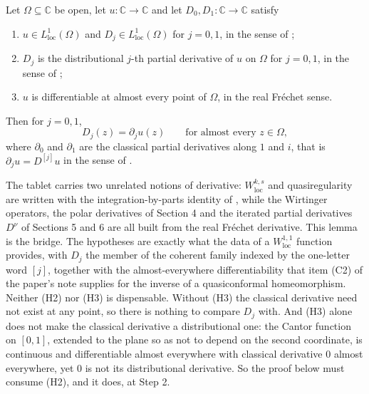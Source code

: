 \begin{lemma}
Let $\Omega\subseteq\mathbb{C}$ be open, let $u\colon\mathbb{C}\to\mathbb{C}$
and let $D_0,D_1\colon\mathbb{C}\to\mathbb{C}$ satisfy
\begin{enumerate}
\item[(H1)] $u\in L^{1}_{\mathrm{loc}}(\Omega)$ and
  $D_j\in L^{1}_{\mathrm{loc}}(\Omega)$ for $j=0,1$, in the sense of
  ;
\item[(H2)] $D_j$ is the distributional $j$-th partial derivative of $u$ on
  $\Omega$ for $j=0,1$, in the sense of ;
\item[(H3)] $u$ is differentiable at almost every point of $\Omega$, in the
  real Fr\'echet sense.
\end{enumerate}
Then for $j=0,1$,
\[
  D_j(z)=\partial_j u(z)\qquad\text{for almost every }z\in\Omega,
\]
where $\partial_0$ and $\partial_1$ are the classical partial derivatives
along $1$ and $i$, that is $\partial_ju=D^{[j]}u$ in the sense of
.

The tablet carries two unrelated notions of derivative: $W^{k,s}_{\mathrm{loc}}$
and quasiregularity are written with the integration-by-parts identity of
, while the Wirtinger operators, the polar derivatives
of Section 4 and the iterated partial derivatives $D^\nu$ of Sections 5 and 6
are all built from the real Fr\'echet derivative.  This lemma is the bridge.
The hypotheses are exactly what the data of a $W^{1,1}_{\mathrm{loc}}$
function provides, with $D_j$ the member of the coherent family indexed by the
one-letter word $[j]$, together with the almost-everywhere differentiability
that item (C2) of the paper's note supplies for the inverse of a quasiconformal
homeomorphism.  Neither (H2) nor (H3) is dispensable.  Without (H3) the
classical derivative need not exist at any point, so there is nothing to
compare $D_j$ with.  And (H3) alone does not make the classical derivative a
distributional one: the Cantor function on $[0,1]$, extended to the plane so as
not to depend on the second coordinate, is continuous and differentiable almost
everywhere with classical derivative $0$ almost everywhere, yet $0$ is not its
distributional derivative.  So the proof below must consume (H2), and it does,
at Step 2.
\end{lemma}
